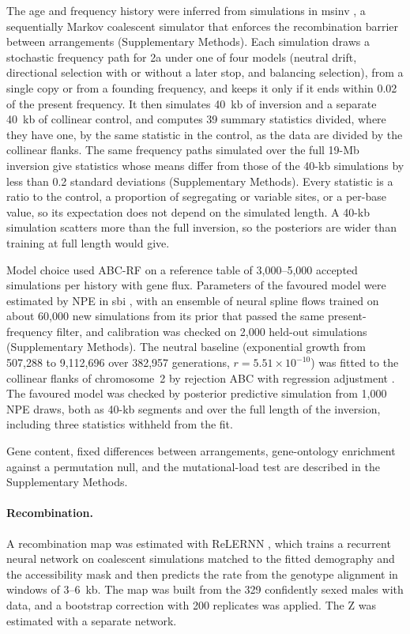 \documentclass[11pt]{article}
\begin{document}
The age and frequency history were inferred from simulations in msinv \citep{msinv}, a sequentially Markov coalescent simulator that enforces the recombination barrier between arrangements (Supplementary Methods). Each simulation draws a stochastic frequency path for 2a under one of four models (neutral drift, directional selection with or without a later stop, and balancing selection), from a single copy or from a founding frequency, and keeps it only if it ends within 0.02 of the present frequency. It then simulates 40~kb of inversion and a separate 40~kb of collinear control, and computes 39 summary statistics divided, where they have one, by the same statistic in the control, as the data are divided by the collinear flanks. The same frequency paths simulated over the full 19-Mb inversion give statistics whose means differ from those of the 40-kb simulations by less than 0.2 standard deviations (Supplementary Methods). Every statistic is a ratio to the control, a proportion of segregating or variable sites, or a per-base value, so its expectation does not depend on the simulated length. A 40-kb simulation scatters more than the full inversion, so the posteriors are wider than training at full length would give.

Model choice used ABC-RF \citep{pudlo2016} on a reference table of 3{,}000--5{,}000 accepted simulations per history with gene flux. Parameters of the favoured model were estimated by NPE in sbi \citep{tejero2020,boelts2025}, with an ensemble of neural spline flows \citep{durkan2019} trained on about 60{,}000 new simulations from its prior that passed the same present-frequency filter, and calibration was checked on 2{,}000 held-out simulations (Supplementary Methods). The neutral baseline (exponential growth from 507{,}288 to 9{,}112{,}696 over 382{,}957 generations, $r=5.51\times10^{-10}$) was fitted to the collinear flanks of chromosome~2 by rejection ABC with regression adjustment \citep{beaumont2002}. The favoured model was checked by posterior predictive simulation from 1{,}000 NPE draws, both as 40-kb segments and over the full length of the inversion, including three statistics withheld from the fit.

Gene content, fixed differences between arrangements, gene-ontology enrichment against a
permutation null, and the mutational-load test are described in the Supplementary Methods.

\paragraph{Recombination.}
A recombination map was estimated with ReLERNN \citep{adrion2020relernn}, which trains a recurrent neural network
on coalescent simulations matched to the fitted demography and the accessibility mask and then predicts the rate
from the genotype alignment in windows of 3--6~kb. The map was built from the 329 confidently sexed males with data, and a bootstrap correction with 200 replicates was
applied. The Z was estimated with a separate network.
\end{document}
